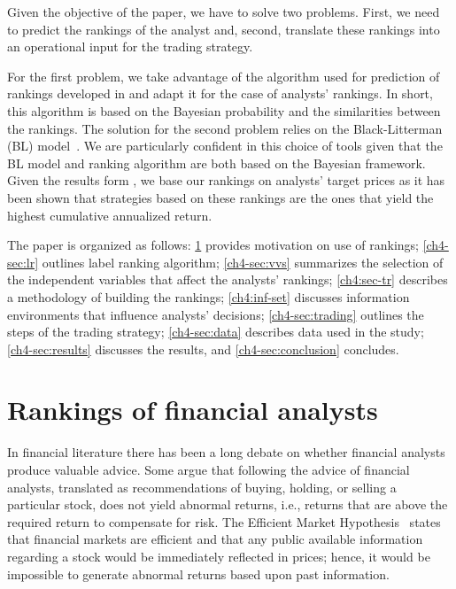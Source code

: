 \documentclass[12pt,a4paper]{article}\usepackage[]{graphicx}\usepackage[]{color}
\begin{document}
Given the objective of the paper, we have to solve two problems. First, we need to predict the rankings of the analyst and, second, translate these rankings into an operational input for the trading strategy.

For the first problem, we take advantage of the algorithm used for prediction of rankings developed in \cite{aiguzhinov2010} and adapt it for the case of analysts' rankings. In short, this algorithm is based on the Bayesian probability and the similarities between the rankings.
The solution for the second problem relies on the Black-Litterman (BL) model~\citep{black1992}. We are particularly confident in this choice of tools given that the BL model and ranking algorithm are both based on the Bayesian framework. Given the results form \cite{aiguzhinov2015a}, we base our rankings on analysts' target prices as it has been shown that strategies based on these rankings are the ones that yield the highest cumulative annualized return.

The paper is organized as follows: \ref{ch4-sec:ranking} provides motivation on use of rankings; \ref{ch4-sec:lr} outlines label ranking algorithm; \ref{ch4-sec:vvs} summarizes the selection of the independent variables that affect the analysts' rankings; \ref{ch4:sec-tr} describes a methodology of building the rankings; \ref{ch4:inf-set} discusses information environments that influence analysts' decisions; \ref{ch4-sec:trading} outlines the steps of the trading strategy; \ref{ch4-sec:data} describes data used in the study; \ref{ch4-sec:results} discusses the results, and \ref{ch4-sec:conclusion} concludes.

\section{Rankings of financial  analysts}
\label{ch4-sec:ranking}
In  financial literature there has been a long debate on whether financial analysts produce valuable  advice. Some argue that following the advice of financial analysts,  translated as recommendations of buying, holding, or selling a particular stock, does not yield  abnormal returns, i.e.,  returns that are above the required return to compensate for risk. The Efficient Market Hypothesis~\citep{fama1970ecm} states that financial markets are efficient and that any public available information  regarding a stock would be immediately reflected in prices; hence, it would be  impossible to generate abnormal returns based upon past information.
\end{document}
